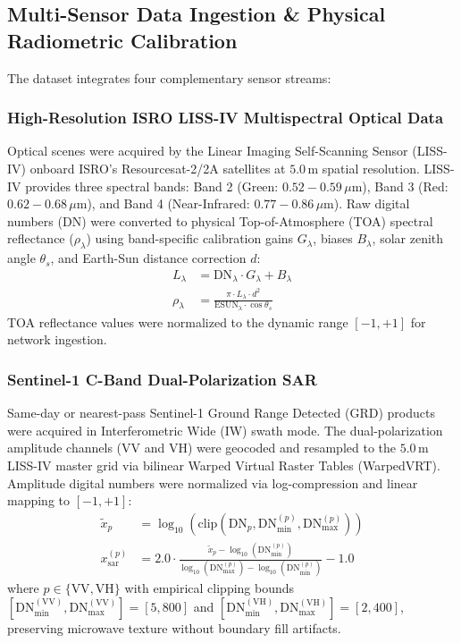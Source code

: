 \subsection{Multi-Sensor Data Ingestion \& Physical Radiometric Calibration}
The dataset integrates four complementary sensor streams:

\subsubsection{High-Resolution ISRO LISS-IV Multispectral Optical Data}
Optical scenes were acquired by the Linear Imaging Self-Scanning Sensor (LISS-IV) onboard ISRO's Resourcesat-2/2A satellites at $5.0\,\text{m}$ spatial resolution. LISS-IV provides three spectral bands: Band 2 (Green: $0.52 - 0.59\,\mu\text{m}$), Band 3 (Red: $0.62 - 0.68\,\mu\text{m}$), and Band 4 (Near-Infrared: $0.77 - 0.86\,\mu\text{m}$). Raw digital numbers ($\text{DN}$) were converted to physical Top-of-Atmosphere (TOA) spectral reflectance ($\rho_{\lambda}$) using band-specific calibration gains $G_{\lambda}$, biases $B_{\lambda}$, solar zenith angle $\theta_s$, and Earth-Sun distance correction $d$:
\begin{align}
    L_{\lambda} &= \text{DN}_{\lambda} \cdot G_{\lambda} + B_{\lambda} \\
    \rho_{\lambda} &= \frac{\pi \cdot L_{\lambda} \cdot d^2}{\text{ESUN}_{\lambda} \cdot \cos\theta_s}
\end{align}
TOA reflectance values were normalized to the dynamic range $[-1, +1]$ for network ingestion.

\subsubsection{Sentinel-1 C-Band Dual-Polarization SAR}
Same-day or nearest-pass Sentinel-1 Ground Range Detected (GRD) products were acquired in Interferometric Wide (IW) swath mode. The dual-polarization amplitude channels (VV and VH) were geocoded and resampled to the $5.0\,\text{m}$ LISS-IV master grid via bilinear Warped Virtual Raster Tables (WarpedVRT). Amplitude digital numbers were normalized via log-compression and linear mapping to $[-1, +1]$:
\begin{align}
    \tilde{x}_p &= \log_{10}\left( \text{clip}(\text{DN}_p, \text{DN}_{\min}^{(p)}, \text{DN}_{\max}^{(p)}) \right) \\
    x_{\text{sar}}^{(p)} &= 2.0 \cdot \frac{\tilde{x}_p - \log_{10}(\text{DN}_{\min}^{(p)})}{\log_{10}(\text{DN}_{\max}^{(p)}) - \log_{10}(\text{DN}_{\min}^{(p)})} - 1.0
\end{align}
where $p \in \{\text{VV}, \text{VH}\}$ with empirical clipping bounds $[\text{DN}_{\min}^{(\text{VV})}, \text{DN}_{\max}^{(\text{VV})}] = [5, 800]$ and $[\text{DN}_{\min}^{(\text{VH})}, \text{DN}_{\max}^{(\text{VH})}] = [2, 400]$, preserving microwave texture without boundary fill artifacts.

